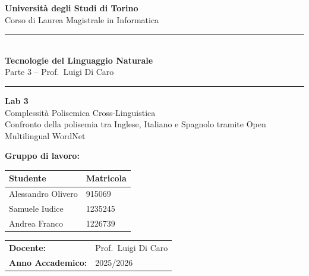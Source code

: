 \documentclass[12pt,a4paper]{article}
\newcommand{\HRule}{\rule{\linewidth}{0.5mm}}
\begin{document}
\raggedbottom

\begin{titlepage}
  \centering
  \vspace*{1.5cm}

  {\Large\textbf{Universit\`a degli Studi di Torino}\\[0.3em]
  Corso di Laurea Magistrale in Informatica}

  \vspace{1cm}
  \HRule\\[0.4em]
  {\LARGE\textbf{Tecnologie del Linguaggio Naturale}}\\[0.3em]
  {\large Parte 3 -- Prof.\ Luigi Di Caro}\\[0.2em]
  \HRule

  \vspace{1.2cm}
  {\huge\textbf{Lab 3}}\\[0.5em]
  {\LARGE Complessit\`a Polisemica Cross-Linguistica}\\[0.4em]
  {\large Confronto della polisemia tra Inglese, Italiano e Spagnolo tramite Open Multilingual WordNet}

  \vspace{2cm}

  {\large\textbf{Gruppo di lavoro:}}\\[0.8em]
  \begin{tabular}{ll}
    \toprule
    \textbf{Studente}    & \textbf{Matricola} \\
    \midrule
    Alessandro Olivero   & 915069  \\
    Samuele Iudice       & 1235245 \\
    Andrea Franco        & 1226739 \\
    \bottomrule
  \end{tabular}

  \vspace{1.5cm}
  \begin{tabular}{ll}
    \textbf{Docente:}          & Prof.\ Luigi Di Caro \\[0.3em]
    \textbf{Anno Accademico:}  & 2025/2026 \\
  \end{tabular}

  \vfill
\end{titlepage}

\tableofcontents
\newpage

\end{document}
